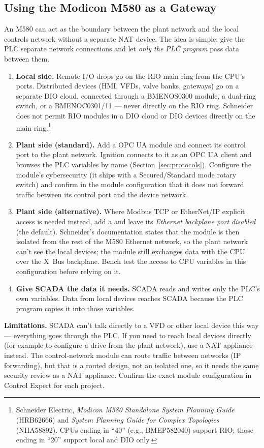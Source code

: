 \subsection{Using the Modicon M580 as a Gateway}\label{sec:m580-gateway}
An M580 can act as the boundary between the plant network and the local controls network without a separate NAT device. The idea is simple: give the PLC separate network connections and let \emph{only the PLC program} pass data between them.
\begin{enumerate}[itemsep=2pt]
  \item \textbf{Local side.} Remote I/O drops go on the RIO main ring from the CPU's ports. Distributed devices (HMI, VFDs, valve banks, gateways) go on a separate DIO cloud, connected through a BMENOS0300 module, a dual-ring switch, or a BMENOC0301/11 --- never directly on the RIO ring. Schneider does not permit RIO modules in a DIO cloud or DIO devices directly on the main ring.\footnote{Schneider Electric, \emph{Modicon M580 Standalone System Planning Guide} (HRB62666) and \emph{System Planning Guide for Complex Topologies} (NHA58892). CPUs ending in ``40'' (e.g., BMEP582040) support RIO; those ending in ``20'' support local and DIO only.}
  \item \textbf{Plant side (standard).} Add a  OPC UA module and connect its control port to the plant network. Ignition connects to it as an OPC UA client and browses the PLC variables by name (Section~\ref{sec:protocols}). Configure the module's cybersecurity (it ships with a Secured/Standard mode rotary switch) and confirm in the module configuration that it does not forward traffic between its control port and the device network.
  \item \textbf{Plant side (alternative).} Where Modbus TCP or EtherNet/IP explicit access is needed instead, add a  and leave its \emph{Ethernet backplane port disabled} (the default). Schneider's documentation states that the module is then isolated from the rest of the M580 Ethernet network, so the plant network can't see the local devices; the module still exchanges data with the CPU over the X~Bus backplane. Bench test the access to CPU variables in this configuration before relying on it.
  \item \textbf{Give SCADA the data it needs.} SCADA reads and writes only the PLC's own variables. Data from local devices reaches SCADA because the PLC program copies it into those variables.
\end{enumerate}
\textbf{Limitations.} SCADA can't talk directly to a VFD or other local device this way --- everything goes through the PLC. If you need to reach local devices directly (for example to configure a drive from the plant network), use a NAT appliance instead. The  control-network module can route traffic between networks (IP forwarding), but that is a routed design, not an isolated one, so it needs the same security review as a NAT appliance. Confirm the exact module configuration in Control Expert for each project.

